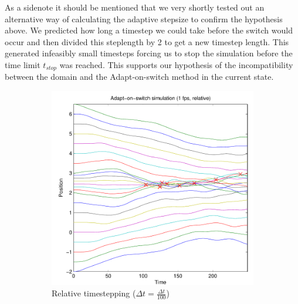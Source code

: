 \documentclass[11pt]{article}
\begin{document}
As a sidenote it should be mentioned that we very shortly tested out an
alternative way of calculating the adaptive stepsize to confirm the hypothesis
above. We predicted how long a timestep we could take before the switch would
occur and then divided this steplength by 2 to get a new timestep length. This
generated infeasibly small timesteps forcing us to stop the simulation before
the time limit $t_{stop}$ was reached. This supports our hypothesis of the
incompatibility between the domain and the Adapt-on-switch method in the current
state.

\begin{figure}[H]
    \begin{subfigure}[t]{0.5\textwidth}
        \includegraphics[width=\textwidth]{../images/switch_multiscale_1fps_relative.pdf}
        \caption{Relative timestepping ($\Delta t = \frac{\Delta t}{100}$)}
        \label{fig:switch_multi_1fps_relative}
    \end{subfigure}
    \begin{subfigure}[t]{0.5\textwidth}

\end{subfigure}
\end{figure}
\end{document}
